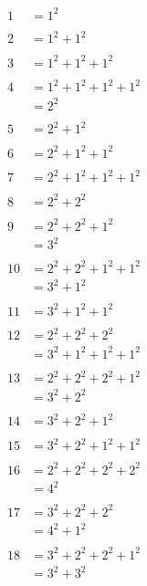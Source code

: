 \documentclass{article}
\numberwithin{equation}{section}
\begin{document}
\begin{multicols}{3}
\noindent
\begin{align*}
1  & = 1^2\\
\\
2  & = 1^2 + 1^2\\
\\
3  & = 1^2 + 1^2 + 1^2\\
\\
4  & = 1^2 + 1^2 + 1^2 + 1^2\\
   & = 2^2\\
\\
5  & = 2^2 + 1^2\\
\\
6  & = 2^2 + 1^2 + 1^2\\
\\
7  & = 2^2 + 1^2 + 1^2 + 1^2\\
\\
8  & = 2^2 + 2^2\\
\\
9  & = 2^2 + 2^2 + 1^2\\
   & = 3^2\\
\\
10 & = 2^2 + 2^2 + 1^2 + 1^2\\
   & = 3^2 + 1^2\\
\\
11 & = 3^2 + 1^2 + 1^2\\
\\
12 & = 2^2 + 2^2 + 2^2\\
   & = 3^2 + 1^2 + 1^2 + 1^2\\
\\
13 & = 2^2 + 2^2 + 2^2 + 1^2\\
   & = 3^2 + 2^2\\
\\
14 & = 3^2 + 2^2 + 1^2\\
\\
15 & = 3^2 + 2^2 + 1^2 + 1^2\\
\end{align*}
\vspace{\fill}
\columnbreak
\begin{align*}
16 & = 2^2 + 2^2 + 2^2 + 2^2\\
   & = 4^2\\
\\
17 & = 3^2 + 2^2 + 2^2\\
   & = 4^2 + 1^2\\
\\
18 & = 3^2 + 2^2 + 2^2 + 1^2\\
   & = 3^2 + 3^2\\

\end{align*}
\end{multicols}
\end{document}
